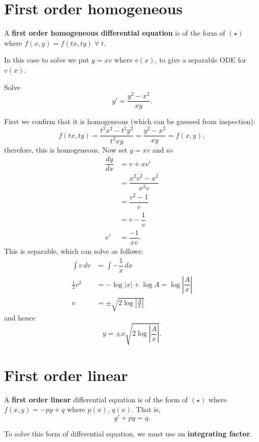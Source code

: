 \section{First order homogeneous}

\begin{definition}
    A \textbf{first order homogeneous differential equation} is of the form of $(\star)$ where $f(x,y)=f(tx,ty)\;\forall\;t$.
\end{definition}

In this case to solve we put $y=xv$ where $v(x)$, to give a separable ODE for $v(x)$.

\begin{example}
    Solve \[y'=\dfrac{y^2-x^2}{xy}.\]
    
    First we confirm that it is homogeneous (which can be guessed from inspection): \[f(tx,ty)=\dfrac{t^2x^2-t^2y^2}{t^2xy}=\dfrac{y^2-x^2}{xy}=f(x,y),\] therefore, this is homogeneous. Now set $y=xv$ and so 
    \begin{align*}
        \dfrac{dy}{dx}&=v+xv'\\
        &=\dfrac{x^2v^2-x^2}{x^2v}\\
        &=\dfrac{v^2-1}{v}\\
        &=v-\dfrac1v\\
        v'&=\dfrac{-1}{xv}.
    \end{align*}
    This is separable, which can solve as follows:
    \begin{align*}
        \int v\,dv&=\int -\dfrac1x\,dx\\
        \frac12v^2&=-\log{|x|}+\log{A}=\log\left|\dfrac{A}{x}\right|\\
        v&=\pm\sqrt{2\log\left|\frac{A}{x}\right|}
    \end{align*}
    and hence \[y=\pm x\sqrt{2\log\left|\frac{A}{x}\right|}.\]
\end{example}

\section{First order linear}

\begin{definition}
    A \textbf{first order linear} differential equation is of the form of $(\star)$ where $f(x,y)=-py+q$ where $p(x)$, $q(x)$. That is, \[y'+py=q.\]
\end{definition}

To solve this form of differential equation, we must use an \textbf{integrating factor}.

